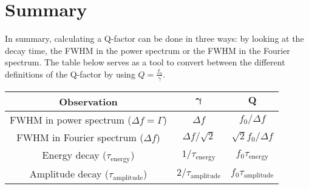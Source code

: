 \section{Summary}
In summary, calculating a Q-factor can be done in three ways: by looking at the decay time, the FWHM in the power spectrum or the FWHM in the Fourier spectrum. The table below serves as a tool to convert between the different definitions of the Q-factor by using $Q = \frac{f_0}{\gamma}$.

\begin{table}[h]
    \centering
    \begin{tabular}{ccc}
        \toprule
        \textbf{Observation} & $\bm{\gamma}$ & $\bm{Q}$ \\
        \midrule
        FWHM in power spectrum ($\Delta f = \Gamma$) & $\Delta f$ & $f_0 / \Delta f$ \\
        FWHM in Fourier spectrum ($\Delta f$) & $\Delta f / \sqrt{2}$ & $\sqrt{2} f_0 / \Delta f$ \\
        Energy decay ($\tau_\text{energy}$) & $1 / \tau_\text{energy}$ & $f_0 \tau_\text{energy}$ \\
        Amplitude decay ($\tau_\text{amplitude}$) & $2 / \tau_\text{amplitude}$ & $f_0 \tau_\text{amplitude}$ \\
        \bottomrule
    \end{tabular}
\end{table}
